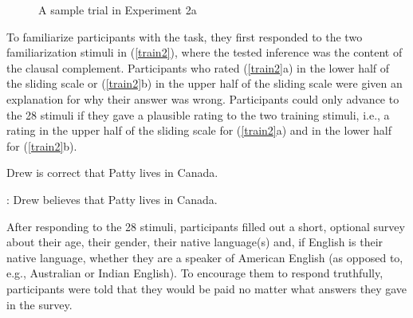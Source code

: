 \documentclass[11pt,fleqn]{article}
\newcommand{\6}{\mbox{$[\hspace*{-.6mm}[$}}
\newcommand{\9}{\mbox{$]\hspace*{-.6mm}]$}}
\begin{document}
\begin{figure}[H]
\begin{center}
\end{center}
\caption{A sample trial in Experiment 2a}\label{f-trial-exp3}
\end{figure}

To familiarize participants with the task, they first responded to the two familiarization stimuli in (\ref{train2}), where the tested inference was the content of the clausal complement. Participants who rated (\ref{train2}a) in the lower half of the sliding scale or (\ref{train2}b) in the upper half of the sliding scale were given an explanation for why their answer was wrong. Participants could only advance to the 28 stimuli if they gave a plausible rating to the two training stimuli, i.e., a rating in the upper half of the sliding scale for (\ref{train2}a) and in the lower half for (\ref{train2}b).

\begin{exe}
\ex\label{train2}
\begin{xlist}
 Drew is correct that Patty lives in Canada. 

: Drew believes that Patty lives in Canada.
\end{xlist}
\end{exe}

After responding to the 28 stimuli, participants filled out a short, optional survey about their age, their gender, their native language(s) and, if English is their native language, whether they are a speaker of American English (as opposed to, e.g., Australian or Indian English). To encourage them to respond truthfully, participants were told that they would be paid no matter what answers they gave in the survey.
\end{document}
